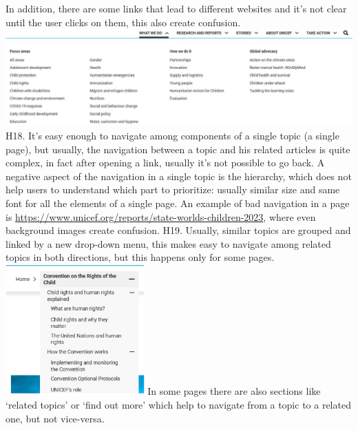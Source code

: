 \newline In addition, there are some links that lead to different websites and it’s not clear until the user clicks on them, this also create confusion.
\newline \includegraphics[width=\textwidth]{FinalScores20.jpg}
\newline
\newline H18.	It’s easy enough to navigate among components of a single topic (a single page), but usually, the navigation between a topic and his related articles is quite complex, in fact after opening a link, usually it’s not possible to go back.
\newline A negative aspect of the navigation in a single topic is the hierarchy, which does not help users to understand which part to prioritize: usually similar size and same font for all the elements of a single page.
\newline An example of bad navigation in a page is \href{https://www.unicef.org/reports/state-worlds-children-2023}{https://www.unicef.org/reports/state-worlds-children-2023}, where even background images create confusion.
\newline
\newline H19.	Usually, similar topics are grouped and linked by a new drop-down menu, this makes easy to navigate among related topics in both directions, but this happens only for some pages.
\newline \includegraphics[width=0.4\textwidth]{FinalScores21.jpg}
\newline In some pages there are also sections like ‘related topics’ or ‘find out more’ which help to navigate from a topic to a related one, but not vice-versa.
